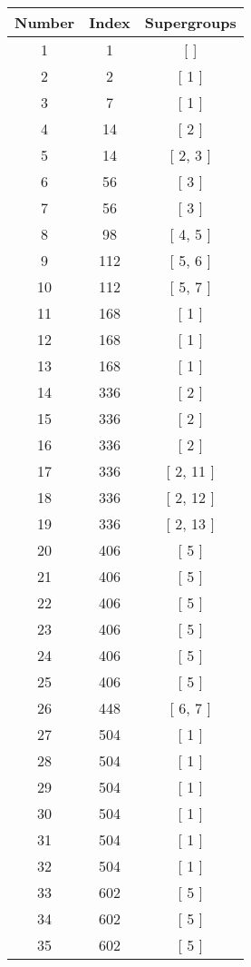 \begin{center}
\begin{longtable}[H]{|| c c c ||}
\hline
Number & Index & Supergroups \\ 
\hline
1 & 1 & [ ] \\ 
\hline
2 & 2 & [ 1 ] \\ 
\hline
3 & 7 & [ 1 ] \\ 
\hline
4 & 14 & [ 2 ] \\ 
\hline
5 & 14 & [ 2, 3 ] \\ 
\hline
6 & 56 & [ 3 ] \\ 
\hline
7 & 56 & [ 3 ] \\ 
\hline
8 & 98 & [ 4, 5 ] \\ 
\hline
9 & 112 & [ 5, 6 ] \\ 
\hline
10 & 112 & [ 5, 7 ] \\ 
\hline
11 & 168 & [ 1 ] \\ 
\hline
12 & 168 & [ 1 ] \\ 
\hline
13 & 168 & [ 1 ] \\ 
\hline
14 & 336 & [ 2 ] \\ 
\hline
15 & 336 & [ 2 ] \\ 
\hline
16 & 336 & [ 2 ] \\ 
\hline
17 & 336 & [ 2, 11 ] \\ 
\hline
18 & 336 & [ 2, 12 ] \\ 
\hline
19 & 336 & [ 2, 13 ] \\ 
\hline
20 & 406 & [ 5 ] \\ 
\hline
21 & 406 & [ 5 ] \\ 
\hline
22 & 406 & [ 5 ] \\ 
\hline
23 & 406 & [ 5 ] \\ 
\hline
24 & 406 & [ 5 ] \\ 
\hline
25 & 406 & [ 5 ] \\ 
\hline
26 & 448 & [ 6, 7 ] \\ 
\hline
27 & 504 & [ 1 ] \\ 
\hline
28 & 504 & [ 1 ] \\ 
\hline
29 & 504 & [ 1 ] \\ 
\hline
30 & 504 & [ 1 ] \\ 
\hline
31 & 504 & [ 1 ] \\ 
\hline
32 & 504 & [ 1 ] \\ 
\hline
33 & 602 & [ 5 ] \\ 
\hline
34 & 602 & [ 5 ] \\ 
\hline
35 & 602 & [ 5 ] \\ 
\hline

\end{longtable}
\end{center}
